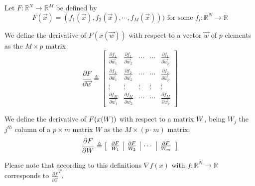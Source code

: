 
Let $F:\mathbb{R}^N \rightarrow \mathbb{R}^M$ be defined by
\begin{equation}
F(\vec{x}) = (f_1(\vec{x}),f_2(\vec{x}),\cdots,f_M(\vec{x}))) \text{    for some  } f_i:\mathbb{R}^N \rightarrow \mathbb{R}
\end{equation}

\begin{defn}
 We define the derivative of $F(x(\vec{w}))$ with respect to a vector $\vec{w}$ of $p$ elements as the $M \times p$ matrix
\begin{equation}
\frac{\partial F}{\partial \vec{w}} \triangleq
\begin{bmatrix}
   \frac{\partial f_1}{\partial \vec{w}_1}    & \frac{\partial f_1}{\partial \vec{w}_2}                & \cdots      & \cdots       & \frac{\partial f_1}{\partial \vec{w}_p}  \\
   \frac{\partial f_2}{\partial \vec{w}_1}    & \frac{\partial f_2}{\partial \vec{w}_2}                & \cdots      & \cdots       & \frac{\partial f_2}{\partial \vec{w}_p}  \\
   \vdots                & \vdots           & \vdots      & \vdots       &\vdots\\
   \frac{\partial f_M}{\partial \vec{w}_1}    & \frac{\partial f_M}{\partial \vec{w}_2}                & \cdots      & \cdots       & \frac{\partial f_M}{\partial \vec{w}_p}
\end{bmatrix}
\end{equation}
\end{defn}


\begin{defn}
We define the derivative of $F(x(W))$ with respect to a matrix $W$, being $W_j$ the $j^{th}$ column of a 
$p\times m$ matrix $W$ as the $M\times (p \cdot m )$ matrix:
\begin{equation}
\frac{\partial F}{\partial W} \triangleq
\left[
\begin{array}{c|c|c|c}
\frac{\partial F}{W_1} & \frac{\partial F}{W_2} & \cdots & \frac{\partial F}{W_m} \\
\end{array}
\right]
\end{equation}
\end{defn}
Please note that according to this definitions $\nabla f(x)$ with $f:\mathbb{R}^N \rightarrow \mathbb{R}$ corresponds to $\frac{\partial f}{\partial\vec{x}}^T$.





